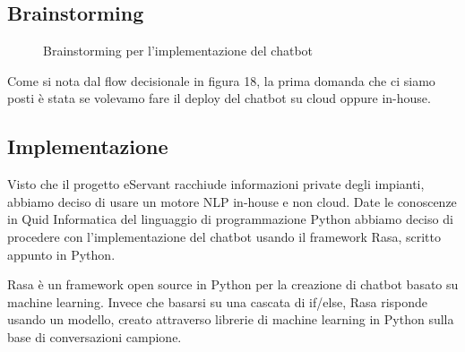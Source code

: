 \subsection{Brainstorming}
\begin{figure}[htp]
    \centering  
    \caption{Brainstorming per l'implementazione del chatbot}
\end{figure}


Come si nota dal flow decisionale in figura 18, la prima domanda che ci siamo posti è stata se volevamo fare il deploy del
chatbot su cloud oppure in-house.\\

\subsection{Implementazione}

\begin{figure}[htp]
    \centering  
\end{figure}

Visto che il progetto eServant racchiude informazioni private degli impianti, abbiamo deciso di usare un motore
NLP in-house e non cloud.
Date le conoscenze in Quid Informatica del linguaggio di programmazione Python abbiamo deciso di procedere
con l'implementazione del chatbot usando il framework Rasa, scritto appunto in Python.

Rasa è un framework open source in Python per la creazione di chatbot basato su machine learning.
Invece che basarsi su una cascata di if/else, Rasa risponde usando un modello, creato attraverso
librerie di machine learning in Python sulla base di conversazioni campione.
